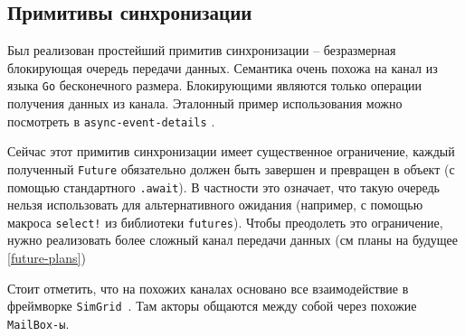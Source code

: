 \subsection{Примитивы синхронизации}

Был реализован простейший примитив синхронизации -- безразмерная блокирующая очередь передачи данных. Семантика очень похожа на канал из языка \texttt{Go} бесконечного размера. Блокирующими являются только операции получения данных из канала. Эталонный пример использования можно посмотреть в \texttt{async-event-details} \cite{async-event-details-example}. 

Сейчас этот примитив синхронизации имеет существенное ограничение, каждый полученный \texttt{Future} обязательно должен быть завершен и превращен в объект (с помощью стандартного \texttt{.await}). В частности это означает, что такую очередь нельзя использовать для альтернативного ожидания (например, с помощью макроса \texttt{select!} из библиотеки \texttt{futures}\cite{rust-futures}). Чтобы преодолеть это ограничение, нужно реализовать более сложный канал передачи данных (см планы на будущее \ref{future-plans})

Стоит отметить, что на похожих каналах основано все взаимодействие в фреймворке \texttt{SimGrid}~\cite{simgrid-example}. Там акторы общаются между собой через похожие \texttt{MailBox-ы}.


